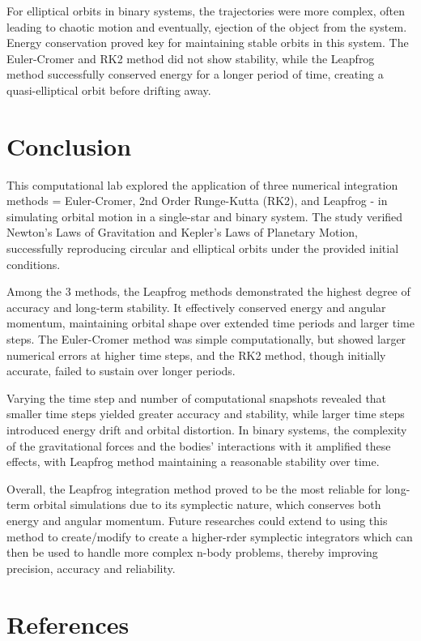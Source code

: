 \documentclass[11 pt, a4paper, twocolumn]{article}
\begin{document}
For elliptical orbits in binary systems, the trajectories were more complex, often leading to chaotic
motion and eventually, ejection of the object from the system. Energy conservation proved key for maintaining
stable orbits in this system. The Euler-Cromer and RK2 method did not show stability, while the Leapfrog
method successfully conserved energy for a longer period of time, creating a quasi-elliptical orbit before drifting away.

\section{Conclusion}
This computational lab explored the application of three numerical integration methods = Euler-Cromer, 
2nd Order Runge-Kutta (RK2), and Leapfrog - in simulating orbital motion in a single-star and binary system.
The study verified Newton's Laws of Gravitation and Kepler's Laws of Planetary Motion, successfully
reproducing circular and elliptical orbits under the provided initial conditions.

Among the 3 methods, the Leapfrog methods demonstrated the highest degree of accuracy and long-term stability.
It effectively conserved energy and angular momentum, maintaining orbital shape over extended time periods and
larger time steps. The Euler-Cromer method was simple computationally, but showed larger numerical errors
at higher time steps, and the RK2 method, though initially accurate, failed to sustain over longer periods.

Varying the time step and number of computational snapshots revealed that smaller time steps yielded greater
accuracy and stability, while larger time steps introduced energy drift and orbital distortion. In binary
systems, the complexity of the gravitational forces and the bodies' interactions with it amplified these effects,
with Leapfrog method maintaining a reasonable stability over time.

Overall, the Leapfrog integration method proved to be the most reliable for long-term orbital simulations
due to its symplectic nature, which conserves both energy and angular momentum. Future researches could extend to using
this method to create/modify to create a higher-rder symplectic integrators which can then be used to handle more complex
n-body problems, thereby improving precision, accuracy and reliability.

\section{References}  
\end{document}
